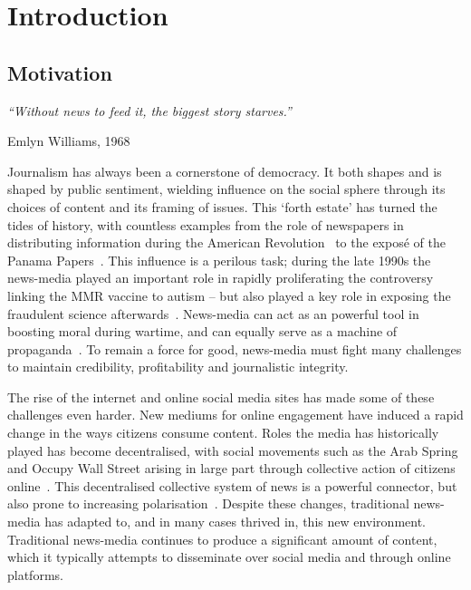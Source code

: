 \chapter{Introduction}\label{ch:introduction}

\section{Motivation}


\epigraph{\em ``Without news to feed it, the biggest story starves.''}{Emlyn Williams, 1968} %


Journalism has always been a cornerstone of democracy. It both shapes and is shaped by public sentiment, wielding influence on the social sphere through its choices of content and its framing of issues. This `forth estate' has turned the tides of history, with countless examples from the role of newspapers in distributing information during the American Revolution~\cite{tranFourthEstateFinal2016} to the exposé of the Panama Papers~\cite{odonovanValueOffshoreSecrets2019}. This influence is a perilous task; during the late 1990s the news-media played an important role in rapidly proliferating the controversy linking the MMR vaccine to autism -- but also played a key role in exposing the fraudulent science afterwards~\cite{godleeWakefieldArticleLinking2011}. News-media can act as an powerful tool in boosting moral during wartime, and can equally serve as a machine of propaganda~\cite{jones2001censorship}. To remain a force for good, news-media must fight many challenges to maintain credibility, profitability and journalistic integrity. 


The rise of the internet and online social media sites has made some of these challenges even harder. New mediums for online engagement have induced a rapid change in the ways citizens consume content. Roles the media has historically played has become decentralised, with social movements such as the Arab Spring and Occupy Wall Street arising in large part through collective action of citizens online~\cite{skinnerSocialMediaRevolution2011}. This decentralised collective system of news is a powerful connector, but also prone to increasing polarisation~\cite{barberaTweetingLeftRight2015}. %
Despite these changes, traditional news-media has adapted to, and in many cases thrived in, this new environment. Traditional news-media continues to produce a significant amount of content, which it typically attempts to disseminate over social media and through online platforms.



